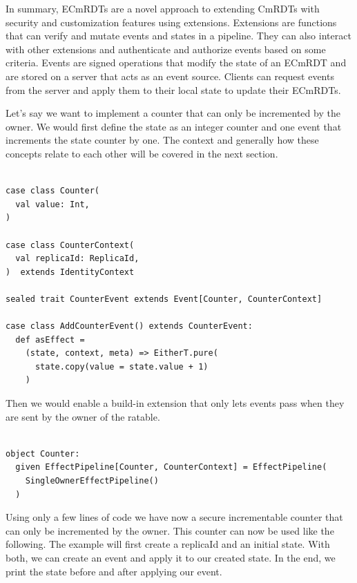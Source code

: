 \documentclass[
	ngerman,
	ruledheaders=section,   %
	class=report,		    %
	thesis={type=bachelor}, %
	accentcolor=9c,			%
	custommargins=true,    %
	marginpar=false,        %
	parskip=half-,          %
	fontsize=11pt,          %
]{tudapub}
\begin{document}
In summary, ECmRDTs are a novel approach to extending CmRDTs with security and customization features using extensions. Extensions are functions that can verify and mutate events and states in a pipeline. They can also interact with other extensions and authenticate and authorize events based on some criteria. Events are signed operations that modify the state of an ECmRDT and are stored on a server that acts as an event source. Clients can request events from the server and apply them to their local state to update their ECmRDTs.


Let's say we want to implement a counter that can only be incremented by the owner. We would first define the state as an integer counter and one event that increments the state counter by one. The context and generally how these concepts relate to each other will be covered in the next section.

\begin{lstlisting}
    
case class Counter(
  val value: Int,
) 

case class CounterContext(
  val replicaId: ReplicaId,
)  extends IdentityContext

sealed trait CounterEvent extends Event[Counter, CounterContext]

case class AddCounterEvent() extends CounterEvent:
  def asEffect =
    (state, context, meta) => EitherT.pure(
      state.copy(value = state.value + 1)
    )

\end{lstlisting}

Then we would enable a build-in extension that only lets events pass when they are sent by the owner of the ratable.

\begin{lstlisting}

object Counter:
  given EffectPipeline[Counter, CounterContext] = EffectPipeline(
    SingleOwnerEffectPipeline()
  )

\end{lstlisting}

Using only a few lines of code we have now a secure incrementable counter that can only be incremented by the owner. This counter can now be used like the following. The example will first create a replicaId and an initial state. With both, we can create an event and apply it to our created state. In the end, we print the state before and after applying our event.
\end{document}

